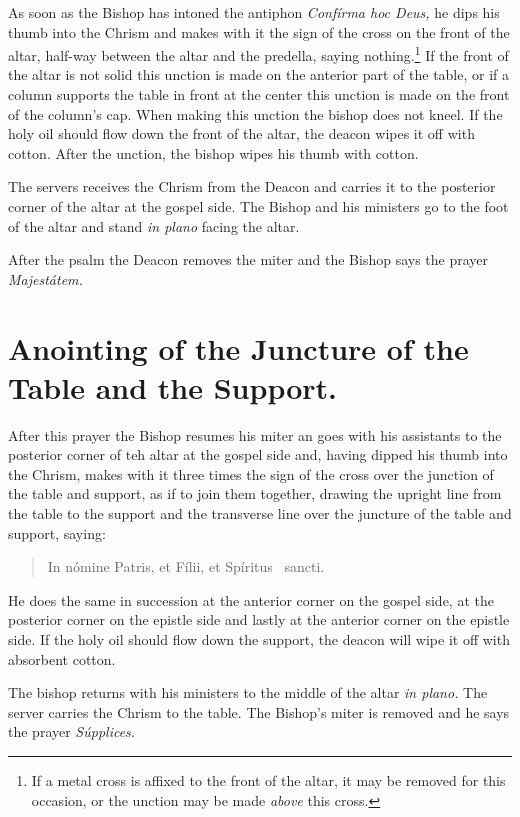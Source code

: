 \documentclass[letterpaper]{report}
\begin{document}
{\rubric As soon as the Bishop has intoned the antiphon \textit{Confírma hoc
Deus,} he dips his thumb into the Chrism and makes with it the sign of the
cross on the front of the altar, half-way between the altar and the predella,
saying nothing.\footnote{If a metal cross is affixed to the front of the altar,
it may be removed for this occasion, or the unction may be made \textit{above}
this cross.} If the front of the altar is not solid this unction is made on the
anterior part of the table, or if a column supports the table in front at the
center this unction is made on the front of the column's cap. When making this
unction the bishop does not kneel. If the holy oil should flow down the front
of the altar, the deacon wipes it off with cotton. After the unction, the
bishop wipes his thumb with cotton.

\rubric The servers receives the Chrism from the Deacon and carries it to the
posterior corner of the altar at the gospel side. The Bishop and his ministers
go to the foot of the altar and stand \textit{in plano} facing the altar.

After the psalm the Deacon removes the miter and the Bishop says the prayer
\textit{Majestátem.}

\section{Anointing of the Juncture of the Table and the Support.}

\rubric After this prayer the Bishop resumes his miter an goes with his
assistants to the posterior corner of teh altar at the gospel side and, having
dipped his thumb into the Chrism, makes with it three times the sign of the
cross over the junction of the table and support, as if to join them together,
drawing the upright line from the table to the support and the transverse line
over the juncture of the table and support, saying:

\begin{quote}
    In nómine Pa\cross tris, et Fí\cross lii, et Spíritus \cross\ sancti.
\end{quote}

He does the same in succession at the anterior corner on the gospel side, at
the posterior corner on the epistle side and lastly at the anterior corner on
the epistle side. If the holy oil should flow down the support, the deacon will
wipe it off with absorbent cotton.

\rubric The bishop returns with his ministers to the middle of the altar
\textit{in plano.} The server carries the Chrism to the table. The Bishop's
miter is removed and he says the prayer \textit{Súpplices.}

}
\end{document}
